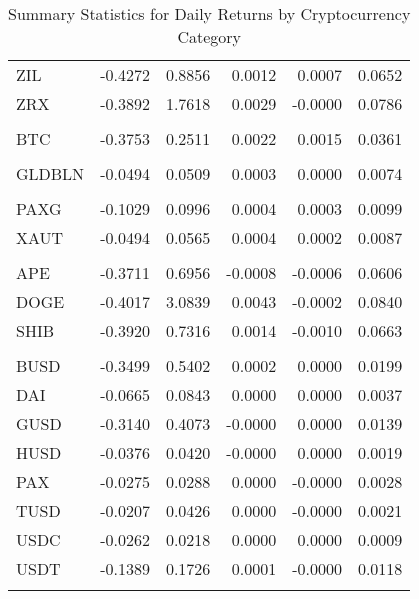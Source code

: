 \begin{table}[ht]
\begin{tabular}{lrrrrr}
ZIL & -0.4272 & 0.8856 & 0.0012 & 0.0007 & 0.0652 \\
ZRX & -0.3892 & 1.7618 & 0.0029 & -0.0000 & 0.0786 \\
\addlinespace
\multicolumn{6}{l}{\textbf{Bitcoin}} \\
BTC & -0.3753 & 0.2511 & 0.0022 & 0.0015 & 0.0361 \\
\addlinespace
\multicolumn{6}{l}{\textbf{Gold}} \\
GLDBLN & -0.0494 & 0.0509 & 0.0003 & 0.0000 & 0.0074 \\
\addlinespace
\multicolumn{6}{l}{\textbf{Gold Pegged}} \\
PAXG & -0.1029 & 0.0996 & 0.0004 & 0.0003 & 0.0099 \\
XAUT & -0.0494 & 0.0565 & 0.0004 & 0.0002 & 0.0087 \\
\addlinespace
\multicolumn{6}{l}{\textbf{Meme Coins}} \\
APE & -0.3711 & 0.6956 & -0.0008 & -0.0006 & 0.0606 \\
DOGE & -0.4017 & 3.0839 & 0.0043 & -0.0002 & 0.0840 \\
SHIB & -0.3920 & 0.7316 & 0.0014 & -0.0010 & 0.0663 \\
\addlinespace
\multicolumn{6}{l}{\textbf{Stablecoins}} \\
BUSD & -0.3499 & 0.5402 & 0.0002 & 0.0000 & 0.0199 \\
DAI & -0.0665 & 0.0843 & 0.0000 & 0.0000 & 0.0037 \\
GUSD & -0.3140 & 0.4073 & -0.0000 & 0.0000 & 0.0139 \\
HUSD & -0.0376 & 0.0420 & -0.0000 & 0.0000 & 0.0019 \\
PAX & -0.0275 & 0.0288 & 0.0000 & -0.0000 & 0.0028 \\
TUSD & -0.0207 & 0.0426 & 0.0000 & -0.0000 & 0.0021 \\
USDC & -0.0262 & 0.0218 & 0.0000 & 0.0000 & 0.0009 \\
USDT & -0.1389 & 0.1726 & 0.0001 & -0.0000 & 0.0118 \\
\addlinespace
\bottomrule
\end{tabular}
\caption{Summary Statistics for Daily Returns by Cryptocurrency Category}
\label{tab:crypto_return_summary}
\end{table}
